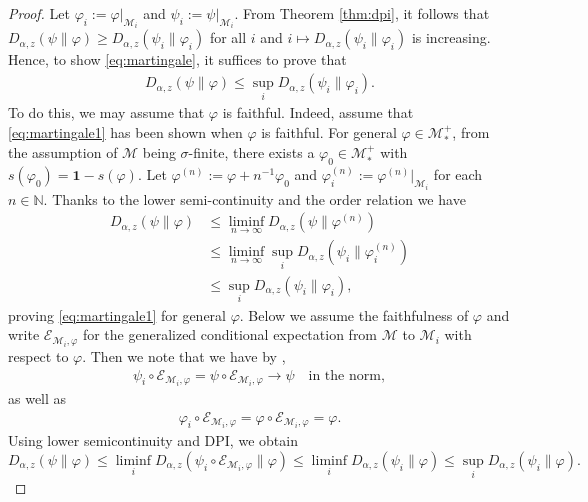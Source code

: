 \documentclass[12pt]{article}
\theoremstyle{definition}
\theoremstyle{remark}
\numberwithin{equation}{section}
\def\cE{\mathcal E}
\def\cM{\mathcal M}
\def\ffi{\varphi}
\def\1{\mathbf{1}}
\def\bN{\mathbb{N}}
\begin{document}
\begin{proof}
Let $\ffi_i:=\ffi|_{\cM_i}$ and $\psi_i:=\psi|_{\cM_i}$. From Theorem
\ref{thm:dpi}, it
follows that $D_{\alpha,z}(\psi\|\ffi)\ge D_{\alpha,z}(\psi_i\|\ffi_i)$ for all $i$ and
$i\mapsto D_{\alpha,z}(\psi_i\|\ffi_i)$ is increasing. Hence, to show \eqref{eq:martingale}, it suffices to
prove that
\begin{align}\label{eq:martingale1}
D_{\alpha,z}(\psi\|\ffi)\le\sup_iD_{\alpha,z}(\psi_i\|\ffi_i).
\end{align}
To do this, we may assume that $\ffi$ is faithful. Indeed, assume that
\eqref{eq:martingale1} has been shown when $\ffi$ is
faithful. For general $\ffi\in\cM_*^+$, from the assumption of $\cM$ being $\sigma$-finite, there exists
a $\ffi_0\in\cM_*^+$ with $s(\ffi_0)=\1-s(\ffi)$. Let $\ffi^{(n)}:=\ffi+n^{-1}\ffi_0$ and
$\ffi_i^{(n)}:=\ffi^{(n)}|_{\cM_i}$ for each $n\in\bN$. Thanks to the lower semi-continuity
\cite[Theorems 1(iv) and 2(iv)]{kato2023onrenyi} and the order relation
\cite[Theorems 1(iii) and 2(iii)]{kato2023onrenyi} we have
\begin{align*}
D_{\alpha,z}(\psi\|\ffi)&\le\liminf_{n\to\infty}D_{\alpha,z}(\psi\|\ffi^{(n)}) \\
&\le\liminf_{n\to\infty}\sup_iD_{\alpha,z}(\psi_i\|\ffi_i^{(n)}) \\
&\le\sup_iD_{\alpha,z}(\psi_i\|\ffi_i),
\end{align*}
proving \eqref{eq:martingale1} for general $\ffi$. Below we assume the faithfulness of $\ffi$ and write
$\cE_{\cM_i,\ffi}$ for the generalized conditional expectation from $\cM$ to $\cM_i$ with respect to $\ffi$. 
Then we note that we have by \cite[Theorem 3]{hiai1984strong},  
\begin{align}\label{eq:martingaleHT}
\psi_i\circ\cE_{\cM_i,\ffi}=\psi\circ\cE_{\cM_i,\ffi}\to\psi\quad\mbox{in the norm},
\end{align}
as well as
\begin{align}\label{eq:condexp}
\ffi_i\circ\cE_{\cM_i,\ffi}=\ffi\circ\cE_{\cM_i,\ffi}=\ffi.
\end{align}
Using lower semicontinuity and DPI, we obtain
\[
D_{\alpha,z}(\psi\|\ffi)\le \liminf_{i}
D_{\alpha,z}(\psi_i\circ\cE_{\cM_i,\varphi}\|\ffi)\le \liminf_i
D_{\alpha,z}(\psi_i\|\varphi)\le \sup_i D_{\alpha,z}(\psi_i\|\ffi).
\]
\end{proof}
\end{document}
